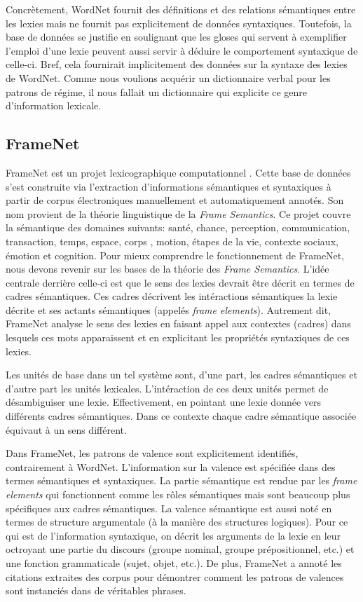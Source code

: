 Concrètement, WordNet fournit des définitions et des relations sémantiques entre les lexies mais ne fournit pas explicitement de données syntaxiques. Toutefois, la base de données se justifie en soulignant que les gloses qui servent à exemplifier l'emploi d'une lexie peuvent aussi servir à déduire le comportement syntaxique de celle-ci. Bref, cela fournirait implicitement des données sur la syntaxe des lexies de WordNet\cite{FellbaumLargescaleLexicographyDigital2014}. Comme nous voulions acquérir un dictionnaire verbal pour les patrons de régime, il nous fallait un dictionnaire qui explicite ce genre d'information lexicale.

\subsection{FrameNet}
FrameNet est un projet lexicographique computationnel \citep{FillmoreBackgroundFramenet2003a}. Cette base de données s'est construite via l'extraction d'informations sémantiques et syntaxiques à partir de  corpus électroniques manuellement et automatiquement annotés. Son nom provient de la théorie linguistique de la \emph{Frame Semantics}\citep{BakerBerkeleyFrameNetProject1998}. Ce projet couvre la sémantique des domaines suivants: santé, chance, perception, communication, transaction, temps, espace, corps , motion, étapes de la vie, contexte sociaux, émotion et cognition. Pour mieux comprendre le fonctionnement de FrameNet, nous devons revenir sur les bases de la théorie des \emph{Frame Semantics}. L'idée centrale derrière celle-ci est que le sens des lexies devrait être décrit en termes de cadres sémantiques. Ces cadres décrivent les intéractions sémantiques la lexie décrite et ses actants sémantiques (appelés \emph{frame elements}). Autrement dit, FrameNet analyse le sens des lexies en faisant appel aux contextes (cadres) dans lesquels ces mots apparaissent et en explicitant les propriétés syntaxiques de ces lexies. 

Les unités de base dans un tel système sont, d'une part, les cadres sémantiques et d'autre part les unités lexicales. L'intéraction de ces deux unités permet de désambiguiser une lexie. Effectivement, en pointant une lexie donnée vers différents cadres sémantiques. Dans ce contexte chaque cadre sémantique associée équivaut à un sens différent.

Dans FrameNet, les patrons de valence sont explicitement identifiés, contrairement à WordNet. L'information sur la valence est spécifiée dans des termes sémantiques et syntaxiques. La partie sémantique est rendue par les \emph{frame elements} qui fonctionnent comme les rôles sémantiques mais sont beaucoup plus spécifiques aux cadres sémantiques. La valence sémantique est aussi noté en termes de structure argumentale (à la manière des structures logiques). Pour ce qui est de l'information syntaxique, on décrit les arguments de la lexie en leur octroyant une partie du discours (groupe nominal, groupe prépositionnel, etc.) et une fonction grammaticale (sujet, objet, etc.). De plus, FrameNet a annoté les citations extraites des corpus pour démontrer comment les patrons de valences sont instanciés dans de véritables phrases. 

